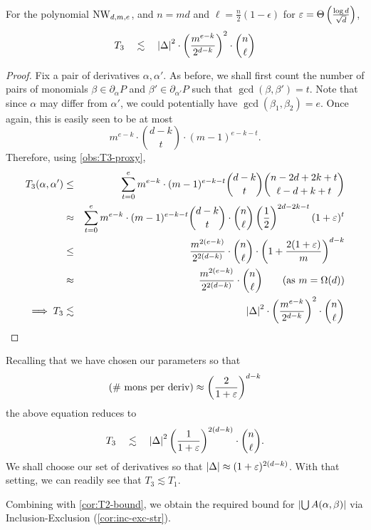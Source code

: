 \begin{lemma}[\cite{KS14}] \label{lem:T3-bound}
For the polynomial $\operatorname{\mathrm{NW}}_{d,m,e}$, and $n = md$ and $\ell = \frac{n}{2}(1 - \epsilon)$ for $\varepsilon = \Theta\left(\frac{\log d}{\sqrt{d}}\right)$, 
\[
T_3 \quad \lesssim \quad \left|\Delta\right|^2 \cdot \left(\frac{m^{e-k}}{2^{d-k}}\right)^2 \cdot \binom{n}{\ell}
\]
\end{lemma}
\begin{proof}
Fix a pair of derivatives $\alpha,\alpha'$. 
As before, we shall first count the number of pairs of monomials $\beta \in \partial_\alpha P$ and $\beta' \in \partial_{\alpha'} P$ such that $\gcd(\beta, \beta') = t$. 
Note that since $\alpha$ may differ from $\alpha'$, we could potentially have $\gcd(\beta_1,\beta_2) = e$. 
Once again, this is easily seen to be at most
\[
m^{e-k} \cdot \binom{d-k}{t} \cdot (m-1)^{e-k-t}. 
\]
\noindent Therefore, using \autoref{obs:T3-proxy}, 
\begin{eqnarray*}
T_3(\alpha, \alpha') & \leq & \sum_{t=0}^{e} m^{e-k} \cdot (m-1)^{e-k -t} \binom{d-k}{t} \binom{n- 2d + 2k +t}{\ell - d + k + t}\\
& \approx & \sum_{t=0}^{e} m^{e-k} \cdot (m-1)^{e-k -t} \binom{d-k}{t} \cdot \binom{n}{\ell} \left(\frac{1}{2}\right)^{2d - 2k -t}  (1+\varepsilon)^{t}\\
& \leq & \frac{m^{2(e-k)}}{2^{2(d-k)}} \cdot \binom{n}{\ell} \cdot \left(1 + \frac{2(1+\varepsilon)}{m}\right)^{d-k}\\
& \approx & \frac{m^{2(e-k)}}{2^{2(d-k)}} \cdot \binom{n}{\ell} \qquad\text{(as $m = \Omega(d)$)}\\
\implies T_3 & \lesssim & \left|\Delta\right|^2 \cdot \left(\frac{m^{e-k}}{2^{d-k}}\right)^2 \cdot \binom{n}{\ell}
\qedhere
\end{eqnarray*}
\end{proof}
\noindent
Recalling that we have chosen our parameters so that 
\[
\text{(\# mons per deriv)} \approx \left(\frac{2}{1+\varepsilon}\right)^{d-k}
\]
the above equation reduces to 
\[
T_3 \quad \lesssim \quad \left|\Delta\right|^2 \left(\frac{1}{1+\varepsilon}\right)^{2(d-k)} \cdot \binom{n}{\ell}.
\]
We shall choose our set of derivatives so that $\left|\Delta\right| \approx (1+\varepsilon)^{2(d-k)}$. 
With that setting, we can readily see that $T_3 \lesssim T_1$. 

Combining with \autoref{cor:T2-bound}, we obtain the required bound for $\left|\bigcup A(\alpha, \beta)\right|$ via Inclusion-Exclusion (\autoref{cor:inc-exc-str}). 

